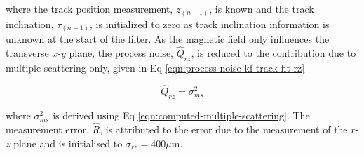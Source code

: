 where the track position measurement, $z_{(n-1)}$, is known and the track inclination, $\tau_{(n-1)}$, is initialized to zero as track inclination information is unknown at the start of the filter. As the magnetic field only influences the transverse $x$-$y$ plane, the process noise, $\hat{Q}_{rz}$, is reduced to the contribution due to multiple scattering only, given in Eq \eqref{eqn:process-noise-kf-track-fit-rz}

\begin{equation}
\hat{Q}_{rz} = \sigma_{ms}^{2}
\label{eqn:process-noise-kf-track-fit-rz}
\end{equation}

where $\sigma_{ms}^{2}$ is derived using Eq \eqref{eqn:computed-multiple-scattering}. The measurement error, $\hat{R}$, is attributed to the error due to the measurement of the $r$-$z$ plane and is initialised to $\sigma_{rz} = 400\mu$m.






